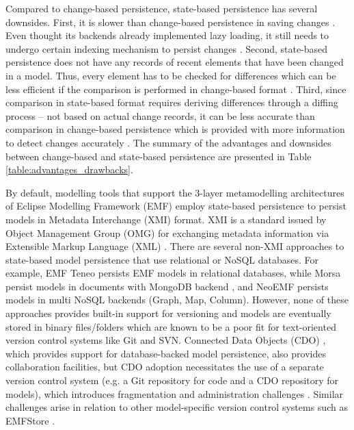 Compared to change-based persistence, state-based persistence has several downsides. First, it is slower than change-based persistence in saving changes \cite{mens2002state}. Even thought its backends already implemented lazy loading, it still needs to undergo certain indexing mechanism to persist changes \cite{daniel2016neoemf,DBLP:conf/models/Espinazo-PaganCM11,eclipse2019cdo}. Second, state-based persistence does not have any records of recent elements that have been changed in a model. Thus, every element has to be checked for differences which can be less efficient if the comparison is performed in change-based format \cite{DBLP:conf/edoc/KoegelHLHD10}. Third, since comparison in state-based format requires deriving differences through a diffing process -- not based on actual change records, it can be less accurate than comparison in change-based persistence which is provided with more information to detect changes accurately \cite{mens2002state,DBLP:conf/edoc/KoegelHLHD10}. The summary of 
the advantages and downsides between change-based and state-based persistence are presented in
Table \ref{table:advantages_drawbacks}.

By default, modelling tools that support the 3-layer metamodelling architectures of Eclipse Modelling Framework (EMF) \cite{steinberg2008emf} employ state-based persistence to persist models in Metadata Interchange (XMI) format. XMI is a standard issued by Object Management Group (OMG) for exchanging metadata information via Extensible Markup Language (XML) \cite{omg2018xmi}. There are several non-XMI approaches to state-based model persistence that use relational or NoSQL databases. For example, EMF Teneo \cite{eclipse2017teneo} persists EMF models in relational databases, while Morsa \cite{DBLP:conf/models/Espinazo-PaganCM11} persist models in documents with MongoDB backend \cite{mongodb}, and NeoEMF \cite{daniel2016neoemf} persists models in multi NoSQL backends (Graph, Map, Column). However, none of these approaches provides built-in support for versioning and models are eventually stored in binary files/folders which are known to be a poor fit for text-oriented version control systems like Git and SVN. Connected Data Objects (CDO) \cite{eclipse2019cdo}, which provides support for database-backed model persistence, also provides collaboration facilities, but CDO adoption necessitates the use of a separate version control system (e.g. a Git repository for code and a CDO repository for models), which introduces fragmentation and administration challenges \cite{barmpis2014evaluation}. Similar challenges arise in relation to other model-specific version control systems such as EMFStore \cite{koegel2010emfstore}.

